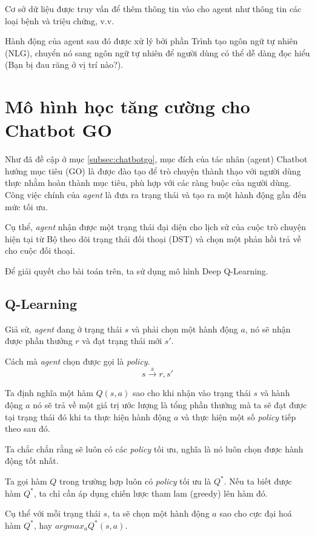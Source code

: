 Cơ sở dữ liệu được truy vấn để thêm thông tin vào cho agent
như thông tin các loại bệnh và triệu chứng, v.v.

Hành động của agent sau đó được xử lý bởi phần Trình tạo ngôn ngữ
tự nhiên (NLG), chuyển nó sang ngôn ngữ tự nhiên để người dùng
có thể dễ dàng đọc hiểu (Bạn bị đau răng ở vị trí nào?).

\section{Mô hình học tăng cường cho Chatbot GO}
\label{sec:model}
Như đã đề cập ở mục \ref{subsec:chatbotgo}, mục đích của tác nhân
(agent) Chatbot hướng mục tiêu (GO) là được đào tạo để trò chuyện
thành thạo với người dùng thực nhằm hoàn thành mục tiêu, phù hợp với
các ràng buộc của người dùng. Công việc chính của \textit{agent} là
đưa ra trạng thái và tạo ra một hành động gần đến mức tối ưu.

Cụ thể, \textit{agent} nhận được một trạng thái đại diện cho lịch sử
của cuộc trò chuyện hiện tại từ Bộ theo dõi trạng thái đối thoại (DST)
và chọn một phản hồi trả về cho cuộc đối thoại.

Để giải quyết cho bài toán trên, ta sử dụng mô hình Deep Q-Learning.

\subsection{Q-Learning}
Giả sử, \textit{agent} đang ở trạng thái $s$ và phải chọn một hành động
$a$, nó sẽ nhận được phần thưởng $r$ và đạt trạng thái mới $s'$.

Cách mà \textit{agent} chọn được gọi là \textit{policy}.
\begin{equation*}
    s \xrightarrow{\text{a}} r,s'
\end{equation*}

Ta định nghĩa một hàm $Q(s,a)$ sao cho khi nhận vào trạng thái $s$
và hành động $a$ nó sẽ trả về một giá trị ước lượng là tổng phần thưởng
mà ta sẽ đạt được tại trạng thái đó khi ta thực hiện hành động $a$
và thực hiện một số \textit{policy} tiếp theo sau đó.

Ta chắc chắn rằng sẽ luôn có các \textit{policy} tối ưu, nghĩa là
nó luôn chọn được hành động tốt nhất.

Ta gọi hàm $Q$ trong trường hợp luôn có \textit{policy} tối ưu là
$Q^*$. Nếu ta biết được hàm $Q^*$, ta chỉ cần áp dụng chiến lược
tham lam (greedy) lên hàm đó.

Cụ thể với mỗi trạng thái $s$, ta sẽ chọn một hành động $a$ sao cho
cực đại hoá hàm $Q^*$, hay ${argmax_a}{Q^*}(s,a)$.

